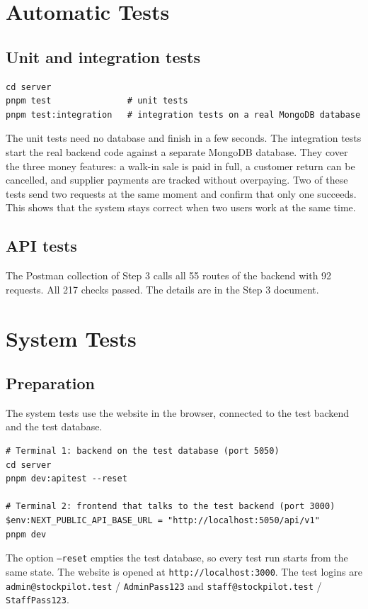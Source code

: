 \documentclass[11pt,a4paper]{article}
\newcommand{\code}[1]{\texttt{#1}}
\begin{document}
\section{Automatic Tests}
\subsection{Unit and integration tests}
\begin{lstlisting}[style=query]
cd server
pnpm test               # unit tests
pnpm test:integration   # integration tests on a real MongoDB database
\end{lstlisting}
The unit tests need no database and finish in a few seconds. The integration tests start the real backend code against a separate MongoDB database. They cover the three money features: a walk-in sale is paid in full, a customer return can be cancelled, and supplier payments are tracked without overpaying. Two of these tests send two requests at the same moment and confirm that only one succeeds. This shows that the system stays correct when two users work at the same time.

\subsection{API tests}
The Postman collection of Step 3 calls all 55 routes of the backend with 92 requests. All 217 checks passed. The details are in the Step 3 document.

\section{System Tests}
\subsection{Preparation}
The system tests use the website in the browser, connected to the test backend and the test database.
\begin{lstlisting}[style=query]
# Terminal 1: backend on the test database (port 5050)
cd server
pnpm dev:apitest --reset

# Terminal 2: frontend that talks to the test backend (port 3000)
$env:NEXT_PUBLIC_API_BASE_URL = "http://localhost:5050/api/v1"
pnpm dev
\end{lstlisting}
The option \code{--reset} empties the test database, so every test run starts from the same state. The website is opened at \code{http://localhost:3000}. The test logins are \code{admin@stockpilot.test} / \code{AdminPass123} and \code{staff@stockpilot.test} / \code{StaffPass123}.
\end{document}
